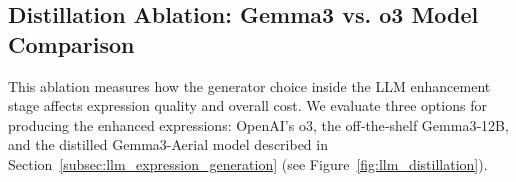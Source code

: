 \begin{table}[t]
\centering
\caption{Expression Enhancement Ablation Across Four Datasets}
\label{tab:ablation_expression_types}
\end{table}

\subsection{Distillation Ablation: Gemma3 vs. o3 Model Comparison}
\label{subsec:distillation_ablation}

This ablation measures how the generator choice inside the LLM enhancement stage affects expression quality and overall cost. We evaluate three options for producing the enhanced expressions: OpenAI’s o3, the off‑the‑shelf Gemma3‑12B, and the distilled Gemma3-Aerial model described in Section~\ref{subsec:llm_expression_generation} (see Figure~\ref{fig:llm_distillation}).

